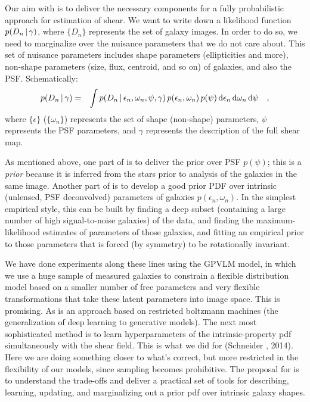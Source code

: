 \documentclass[12pt]{article}
\newcommand{\dd}{\mathrm{d}}
\newcommand{\data}{D}
\newcommand{\intrinsic}{\epsilon}
\newcommand{\shear}{\gamma}
\newcommand{\psf}{\psi}
\begin{document}
Our aim with  is to deliver the necessary
components for a fully probabilistic approach for estimation of shear.
We want to write down a likelihood function $p(\data_n\given\shear)$, where $\{\data_n\}$
represents the set of galaxy images. In order to do so, we need to marginalize over the
nuisance parameters that we do not care about. This set of nuisance parameters includes 
shape parameters (ellipticities and more), non-shape parameters (size, flux, centroid, and so on)
of galaxies, and also the PSF.
Schematically:
\begin{eqnarray}
p(\data_n\given\shear)
  &=& \int p(\data_n\given\intrinsic_n , \omega_{n}, \psf , \shear)
  \,p(\intrinsic_n, \omega_{n})\,p(\psf)\,\dd\intrinsic_n\,\dd\omega_n\,\dd\psf
  \quad ,
\label{integral}
\end{eqnarray}
where $\{\intrinsic\}$ ($\{\omega_{n}\}$) represents the set of shape
(non-shape) parameters, $\psf$ represents the PSF parameters, and $\shear$ represents the description of the full shear map.

As mentioned above, one part of  is to deliver the
prior over PSF $p(\psf)$; this is a \emph{prior} because it is
inferred from the stars prior to analysis of the galaxies in the same
image.
Another part of  is to develop a good prior PDF
over intrinsic (unlensed, PSF deconvolved) parameters of galaxies
$p(\intrinsic_n, \omega_n)$.
In the simplest empirical style, this can be built by finding a deep
subset (containing a large number of high signal-to-noise galaxies) of
the data, and finding the maximum-likelihood estimates of parameters
of those galaxies, and fitting an empirical prior to those parameters
that is forced (by symmetry) to be rotationally invariant.

We have done experiments along these lines using the GPVLM model, in
which we use a huge sample of measured galaxies to constrain a
flexible distribution model based on a smaller number of free
parameters and very flexible transformations that take these latent
parameters into image space.  This is promising.  As is an approach
based on restricted boltzmann machines (the generalization of deep
learning to generative models).
The next most sophisticated method is to learn hyperparameters of the
intrinsic-property pdf simultaneously with the shear field.  This is
what we did for  (Schneider \etal, 2014).  Here we are
doing something closer to what's correct, but more restricted in the
flexibility of our models, since sampling becomes prohibitive.
The proposal for  is to understand the trade-offs
and deliver a practical set of tools for describing, learning,
updating, and marginalizing out a prior pdf over intrinsic galaxy shapes.
\end{document}
